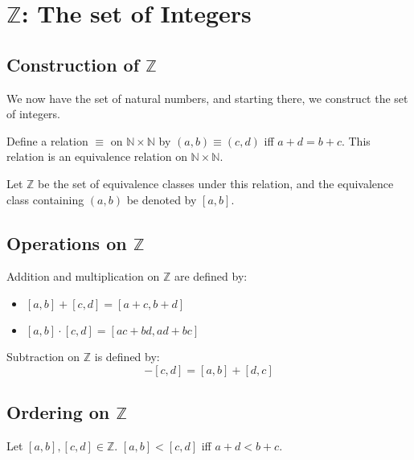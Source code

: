 \documentclass{report}
\begin{document}
	\section{$\mathbb{Z}$: The set of Integers}
		\subsection{Construction of $\mathbb{Z}$}
		We now have the set of natural numbers, and starting there, we construct the set of integers.
		
		\begin{prop} \label{def_Z_equiv_class}
			Define a relation $\equiv$ on $\mathbb{N} \times \mathbb{N}$ by $(a,b) \equiv (c,d)$ iff $a+d=b+c$. This relation is an equivalence relation on $\mathbb{N} \times \mathbb{N}$.
		\end{prop}
	
		Let $\mathbb{Z}$ be the set of equivalence classes under this relation, and the equivalence class containing $(a,b)$ be denoted by $[a,b]$.
		
		\subsection{Operations on $\mathbb{Z}$}
		\begin{defn} \label{def_add_mult_Z}
			Addition and multiplication on $\mathbb{Z}$ are defined by:
			\begin{itemize}
				\item $[a,b]+[c,d]=[a+c,b+d]$
				\item $[a,b] \cdot [c,d]=[ac+bd,ad+bc]$
			\end{itemize}
		\end{defn}
		
		\begin{defn} \label{def_sub_Z}
			Subtraction on $\mathbb{Z}$ is defined by:
			\begin{displaymath}
				[a,b]-[c,d]=[a,b]+[d,c]
			\end{displaymath}
		\end{defn}
	
		\subsection{Ordering on $\mathbb{Z}$}

			\begin{defn} \label{def_order_Z}
				Let $[a,b],[c,d] \in \mathbb{Z}$. $[a,b]<[c,d]$ iff $a+d<b+c$.
			\end{defn}
\end{document}
